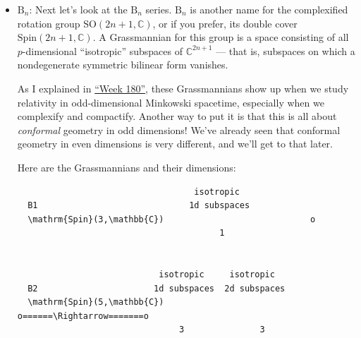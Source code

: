 \documentclass{article}
\begin{document}
\begin{itemize}
\begin{verbatim}
  A2                        vectors        bivectors
  \mathrm{SL}(3,\mathbb{C})                      o---------------o
                               3               3


  A3                   vectors     bivectors      3-vectors
  \mathrm{SL}(4,\mathbb{C})                o-------------o--------------o
                         4             6              4


  A4          vectors      bivectors      3-vectors    4-vectors
  \mathrm{SL}(5,\mathbb{C})        o-------------o--------------o------------o
                 5            10             10            5
\end{verbatim}

  Here the numbers labelling the dots form Pascal's triangle! So we see
  that Pascal's triangle is a quantized version of the multiplication
  table. (That was the answer to the previous puzzle, by the way --- our
  triangle was just the multiplication table viewed from a funny angle.)
\item
  \(\mathrm{B}_n\): Next let's look at the \(\mathrm{B}_n\) series.
  \(\mathrm{B}_n\) is another name for the complexified rotation group
  \(\mathrm{SO}(2n+1,\mathbb{C})\), or if you prefer, its double cover
  \(\mathrm{Spin}(2n+1,\mathbb{C})\). A Grassmannian for this group is a
  space consisting of all \(p\)-dimensional ``isotropic'' subspaces of
  \(\mathbb{C}^{2n+1}\) --- that is, subspaces on which a nondegenerate
  symmetric bilinear form vanishes.

  As I explained in \protect\hyperlink{week180}{``Week 180''}, these
  Grassmannians show up when we study relativity in odd-dimensional
  Minkowski spacetime, especially when we complexify and compactify.
  Another way to put it is that this is all about \emph{conformal}
  geometry in odd dimensions! We've already seen that conformal geometry
  in even dimensions is very different, and we'll get to that later.

  Here are the Grassmannians and their dimensions:

\begin{verbatim}
                                   isotropic 
  B1                              1d subspaces
  \mathrm{Spin}(3,\mathbb{C})                             o
                                        1


                            isotropic     isotropic          
  B2                       1d subspaces  2d subspaces
  \mathrm{Spin}(5,\mathbb{C})                     o======\Rightarrow=======o
                                3               3



\end{verbatim}
\end{itemize}
\end{document}
